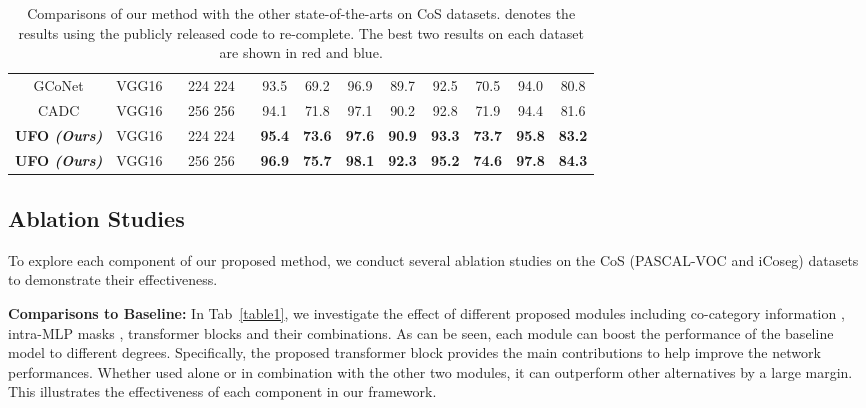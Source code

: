 \documentclass[journal]{IEEEtran}
\begin{document}
\begin{table*}[t]
\begin{center}
{\begin{tabular}{ccc|cc|cc|cc|cc}
				GCoNet\cite{fan2021group}& VGG16 \ & 224  224 \ &  93.5 & 69.2 & 96.9  & 89.7 & 92.5 & 70.5 & 94.0 & 80.8 \\
				
				CADC\cite{zhang2021summarize}& VGG16 \ & 256  256 \ &  94.1 & 71.8 & 97.1  & 90.2 & 92.8 & 71.9 & 94.4 & 81.6 \\
				
			   
				\midrule  \textbf{UFO \textit{(Ours)}} & VGG16 \ & 224  224 \ & \textbf{95.4} & \textbf{{\color{blue}73.6}} & \textbf{97.6} & \textbf{90.9} & \textbf{93.3} & \textbf{73.7} & \textbf{95.8} & \textbf{83.2} \\
				\textbf{UFO \textit{(Ours)}} & VGG16 \ & 256  256 \ & \textbf{{\color{red}96.9}} & \textbf{{\color{red}75.7}} & \textbf{{\color{red}98.1}} & \textbf{{\color{red}92.3}} & \textbf{{\color{blue}95.2}} & \textbf{74.6} & \textbf{{\color{red}97.8}} & \textbf{{\color{blue}84.3}} \\
				\bottomrule \end{tabular}}    
	\end{center}\caption{Comparisons of our method with the other state-of-the-arts on CoS datasets.  denotes the results using the publicly released code to re-complete. The best two results on each dataset are shown in {\color{red} red} and {\color{blue} blue}.}\label{table6}
\end{table*}

\subsection{Ablation Studies} 
To explore each component of our proposed method, we conduct several ablation studies on the CoS (PASCAL-VOC and iCoseg) datasets to demonstrate their effectiveness. 

\vspace{1ex}

\noindent \textbf{Comparisons to Baseline:}
In Tab~\ref{table1}, we investigate the effect of different proposed modules including co-category information , intra-MLP masks , transformer blocks and their combinations. As can be seen, each module can boost the performance of the baseline model to different degrees.
Specifically, the proposed transformer block provides the main contributions to help improve the network performances. Whether used alone or in combination with the other two modules, it can outperform other alternatives by a large margin. This illustrates the effectiveness of each component in our framework. 
\end{document}
